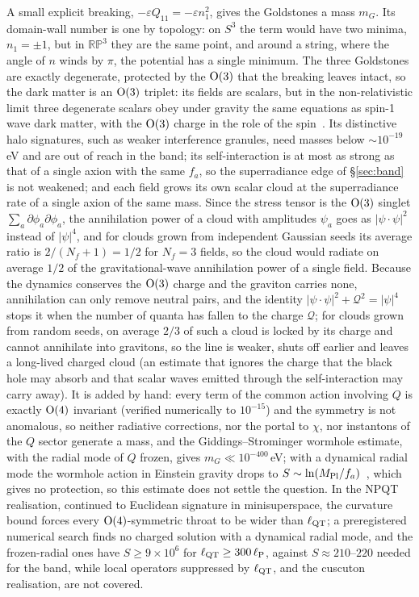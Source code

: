 \documentclass[11pt,a4paper]{article}
\newcommand{\RP}{\mathbb{RP}^3}
\newcommand{\Mpl}{M_{\rm Pl}}
\begin{document}
A small explicit breaking, $-\varepsilon Q_{11}=-\varepsilon n_1^2$, gives the Goldstones a mass $m_G$. Its domain-wall number is one by topology: on $S^3$ the term would have two minima, $n_1=\pm1$, but in $\RP$ they are the same point, and around a string, where the angle of $n$ winds by $\pi$, the potential has a single minimum.
The three Goldstones are exactly degenerate, protected by the ${\rm O}(3)$ that the breaking leaves intact, so the dark matter is an ${\rm O}(3)$ triplet: its fields are scalars, but in the non-relativistic limit three degenerate scalars obey under gravity the same equations as spin-1 wave dark matter, with the ${\rm O}(3)$ charge in the role of the spin~\cite{AdsheadLozanov2021,Amin2022VDM}. Its distinctive halo signatures, such as weaker interference granules, need masses below $\sim10^{-19}$\,eV and are out of reach in the band; its self-interaction is at most as strong as that of a single axion with the same $f_a$, so the superradiance edge of \S\ref{sec:band} is not weakened; and each field grows its own scalar cloud at the superradiance rate of a single axion of the same mass. Since the stress tensor is the ${\rm O}(3)$ singlet $\sum_a\partial\phi_a\partial\phi_a$, the annihilation power of a cloud with amplitudes $\psi_a$ goes as $|\psi\cdot\psi|^2$ instead of $|\psi|^4$, and for clouds grown from independent Gaussian seeds its average ratio is $2/(N_f+1)=1/2$ for $N_f=3$ fields, so the cloud would radiate on average $1/2$ of the gravitational-wave annihilation power of a single field. Because the dynamics conserves the ${\rm O}(3)$ charge and the graviton carries none, annihilation can only remove neutral pairs, and the identity $|\psi\cdot\psi|^2+\mathcal{Q}^2=|\psi|^4$ stops it when the number of quanta has fallen to the charge $\mathcal{Q}$; for clouds grown from random seeds, on average $2/3$ of such a cloud is locked by its charge and cannot annihilate into gravitons, so the line is weaker, shuts off earlier and leaves a long-lived charged cloud (an estimate that ignores the charge that the black hole may absorb and that scalar waves emitted through the self-interaction may carry away).
It is added by hand: every term of the common action involving $Q$ is exactly ${\rm O}(4)$ invariant (verified numerically to $10^{-15}$) and the symmetry is not anomalous, so neither radiative corrections, nor the portal to $\chi$, nor instantons of the $Q$ sector generate a mass, and the Giddings--Strominger wormhole estimate, with the radial mode of $Q$ frozen, gives $m_G\ll10^{-400}$\,eV; with a dynamical radial mode the wormhole action in Einstein gravity drops to $S\sim\ln(\Mpl/f_a)$~\cite{AlveyEscudero2021}, which gives no protection, so this estimate does not settle the question. In the NPQT realisation, continued to Euclidean signature in minisuperspace, the curvature bound forces every ${\rm O}(4)$-symmetric throat to be wider than $\ell_{\rm QT}$; a preregistered numerical search finds no charged solution with a dynamical radial mode, and the frozen-radial ones have $S\ge9\times10^{6}$ for $\ell_{\rm QT}\ge300\,\ell_{\rm P}$, against $S\approx210$--$220$ needed for the band, while local operators suppressed by $\ell_{\rm QT}$, and the cuscuton realisation, are not covered.
\end{document}
